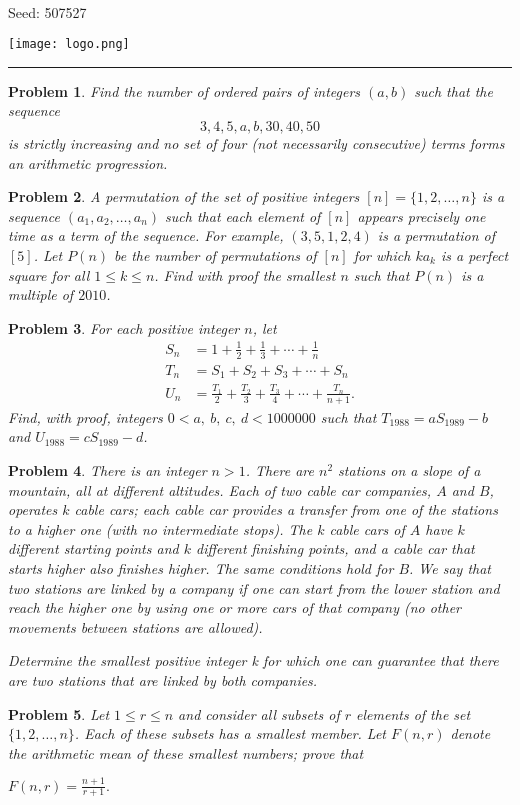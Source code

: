 \documentclass[12pt]{article}
\newtheorem{opg}{Problem}
\begin{document}
\parbox{0.6\textwidth}{ \\[2ex] {\Large Seed: 507527}}
\parbox{0.4\textwidth}{\texttt{[image: logo.png]}}

\hrule

\begin{opg}
Find the number of ordered pairs of integers $(a, b)$ such that the sequence\[3, 4, 5, a, b, 30, 40, 50\]is strictly increasing and no set of four (not necessarily consecutive) terms forms an arithmetic progression.


\end{opg}
\begin{opg}
A permutation of the set of positive integers $[n] = \{1, 2, \ldots, n\}$ is a sequence $(a_1, a_2, \ldots, a_n)$ such that each element of $[n]$ appears precisely one time as a term of the sequence. For example, $(3, 5, 1, 2, 4)$ is a permutation of $[5]$. Let $P(n)$ be the number of permutations of $[n]$ for which $ka_k$ is a perfect square for all $1\leq k\leq n$. Find with proof the smallest $n$ such that $P(n)$ is a multiple of $2010$.


\end{opg}
\begin{opg}
For each positive integer $n$, let
\begin{align*} S_n &= 1 + \frac 12 + \frac 13 + \cdots + \frac 1n \\ T_n &= S_1 + S_2 + S_3 + \cdots + S_n \\ U_n &= \frac{T_1}{2} + \frac{T_2}{3} + \frac{T_3}{4} + \cdots + \frac{T_n}{n+1}. \end{align*}
Find, with proof, integers $0 < a,\ b,\ c,\ d < 1000000$ such that $T_{1988} = a S_{1989} - b$ and $U_{1988} = c S_{1989} - d$.


\end{opg}
\begin{opg}
There is an integer $n > 1$. There are $n^2$ stations on a slope of a mountain, all at different altitudes. Each of two cable car companies, $A$ and $B$, operates $k$ cable cars; each cable car provides a transfer from one of the stations to a higher one (with no intermediate stops). The $k$ cable cars of $A$ have $k$ different starting points and $k$ different finishing points, and a cable car that starts higher also finishes higher. The same conditions hold for $B$. We say that two stations are linked by a company if one can start from the lower station and reach the higher one by using one or more cars of that company (no other movements between stations are allowed).

Determine the smallest positive integer k for which one can guarantee that there are two stations that are linked by both companies.


\end{opg}
\begin{opg}
Let $1 \le r \le n$ and consider all subsets of $r$ elements of the set $\{ 1, 2, \ldots , n \}$.  Each of these subsets has a smallest member.  Let $F(n,r)$ denote the arithmetic mean of these smallest numbers; prove that



$F(n,r) = \frac{n+1}{r+1}.$



\end{opg}
\end{document}
